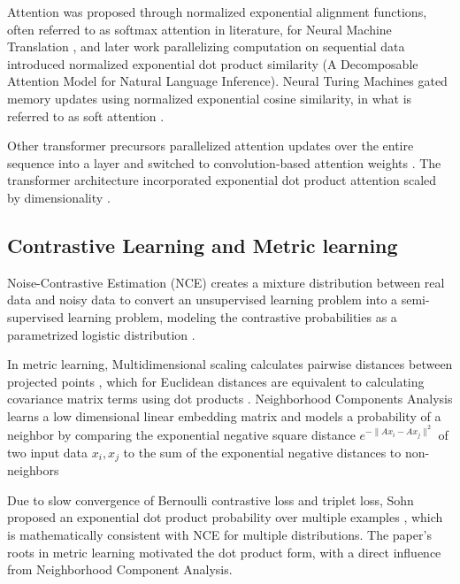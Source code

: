 \documentclass{article}
\begin{document}
Attention was proposed through normalized exponential alignment functions, often referred to as softmax attention in literature, for Neural Machine Translation \cite{DBLP:journals/corr/Graves13,bahdanau2014neural}, and later work parallelizing computation on sequential data introduced normalized exponential dot product similarity \cite{DBLP:journals/corr/ParikhT0U16} (A Decomposable Attention Model for Natural Language Inference).
Neural Turing Machines gated memory updates using normalized exponential cosine similarity, in what is referred to as soft attention \cite{DBLP:journals/corr/GravesWD14}.

Other transformer precursors parallelized attention updates over the entire sequence into a layer and switched to convolution-based attention weights \cite{kaiser2016neural,DBLP:journals/corr/KaiserB16}. 
The transformer architecture incorporated exponential dot product attention scaled by dimensionality \cite{vaswani2017attention}. 

\subsection{Contrastive Learning and Metric learning}
\label{contrastive}
Noise-Contrastive Estimation (NCE) creates a mixture distribution between real data and noisy data to convert an unsupervised learning problem into a semi-supervised learning problem, modeling the contrastive probabilities as a parametrized logistic distribution \cite{Gutmann2010}.

In metric learning, Multidimensional scaling calculates pairwise distances between projected points \cite{cox2000multidimensional}, which for Euclidean distances are equivalent to calculating covariance matrix terms using dot products \cite{bishop2007}.
Neighborhood Components Analysis learns a low dimensional linear embedding matrix and models a probability of a neighbor by comparing the exponential negative square distance
$
  e^{ - \lVert A x_i - A x_j \rVert^2 }
$
of two input data $x_i,x_j$ to the sum of the exponential negative distances to non-neighbors \cite{conf/nips/GoldbergerRHS04}

Due to slow convergence of Bernoulli contrastive loss and triplet loss, Sohn proposed an exponential dot product probability over multiple examples \cite{Sohn2016ImprovedDM}, which is mathematically consistent with NCE for multiple distributions. The paper’s roots in metric learning motivated the dot product form, with a direct influence from Neighborhood Component Analysis.
\end{document}
